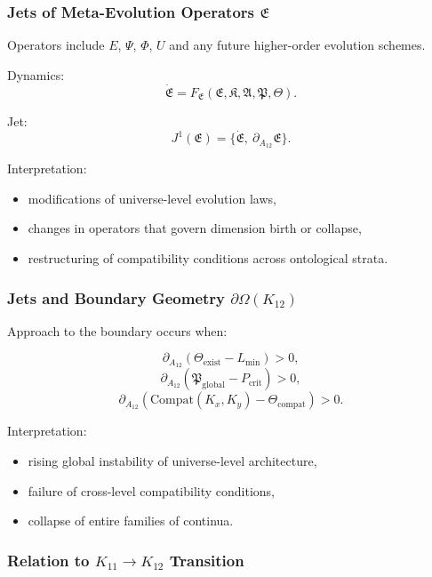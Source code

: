 \subsubsection{Jets of Meta-Evolution Operators $\mathfrak{E}$}

Operators include $E$, $\Psi$, $\Phi$, $U$ and any future higher-order
evolution schemes.

Dynamics:
\[
\dot{\mathfrak{E}}
=
F_{\mathfrak{E}}(\mathfrak{E},\mathfrak{K},\mathfrak{A},\mathfrak{P},\mathfrak{\Theta}).
\]

Jet:
\[
J^1(\mathfrak{E})
= \{\dot{\mathfrak{E}},\ \partial_{A_{12}}\mathfrak{E}\}.
\]

Interpretation:
\begin{itemize}
    \item modifications of universe-level evolution laws,
    \item changes in operators that govern dimension birth or collapse,
    \item restructuring of compatibility conditions across ontological strata.
\end{itemize}


\subsubsection{Jets and Boundary Geometry $\partial\Omega(K_{12})$}

Approach to the boundary occurs when:

\[
\partial_{A_{12}}(\mathfrak{\Theta}_{\mathrm{exist}} - L_{\mathrm{min}}) > 0,
\]
\[
\partial_{A_{12}}(\mathfrak{P}_{\mathrm{global}} - P_{\mathrm{crit}}) > 0,
\]
\[
\partial_{A_{12}}(\mathrm{Compat}(K_x,K_y) - \Theta_{\mathrm{compat}}) > 0.
\]

Interpretation:
\begin{itemize}
    \item rising global instability of universe-level architecture,
    \item failure of cross-level compatibility conditions,
    \item collapse of entire families of continua.
\end{itemize}


\subsubsection{Relation to $K_{11} \to K_{12}$ Transition}

